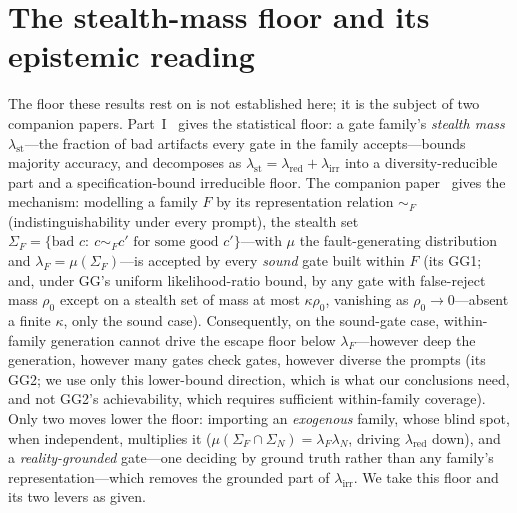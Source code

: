 \documentclass[11pt]{article}
\theoremstyle{definition}
\theoremstyle{remark}
\newcommand{\lst}{\lambda_{\mathrm{st}}}
\newcommand{\lred}{\lambda_{\mathrm{red}}}
\newcommand{\lirr}{\lambda_{\mathrm{irr}}}
\begin{document}
\section{The stealth-mass floor and its epistemic reading}\label{sec:epistemic}
The floor these results rest on is not established here; it is the subject of two companion papers.
Part~I~\cite{matijasevic2026n1} gives the statistical floor: a gate family's \emph{stealth mass}
$\lst$---the fraction of bad artifacts every gate in the family accepts---bounds majority accuracy, and
decomposes as $\lst=\lred+\lirr$ into a diversity-reducible part and a specification-bound irreducible
floor. The companion paper~\cite{matijasevic2026gg} gives the mechanism: modelling a family $F$ by its
representation relation $\sim_F$ (indistinguishability under every prompt), the stealth set
$\Sigma_F=\{\text{bad }c:\ c\sim_F c'\text{ for some good }c'\}$---with $\mu$ the fault-generating
distribution and $\lambda_F=\mu(\Sigma_F)$---is accepted by every \emph{sound} gate built within $F$
(its GG1; and, under GG's uniform likelihood-ratio bound, by any gate with false-reject mass $\rho_0$
except on a stealth set of mass at most $\kappa\rho_0$, vanishing as $\rho_0\to0$---absent a finite
$\kappa$, only the sound case). Consequently, on the sound-gate case, within-family generation cannot
drive the escape floor below $\lambda_F$---however deep the generation, however many gates check gates,
however diverse the prompts (its GG2; we use only this lower-bound direction, which is what our
conclusions need, and not GG2's achievability, which requires sufficient within-family coverage). Only
two moves lower the floor: importing an \emph{exogenous} family, whose blind spot, when independent,
multiplies it ($\mu(\Sigma_F\cap\Sigma_N)=\lambda_F\lambda_N$, driving $\lred$ down), and a
\emph{reality-grounded} gate---one deciding by ground truth rather than any family's
representation---which removes the grounded part of $\lirr$. We take this floor and its two levers as
given.
\end{document}
